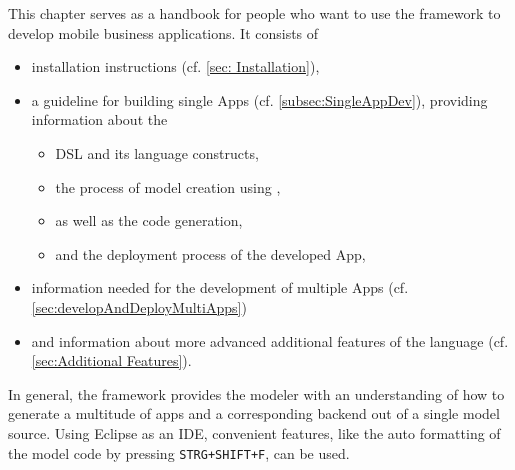 

This chapter serves as a handbook for people who want to use the \MD framework to develop mobile business applications. It consists of

\begin{itemize}
	\item installation instructions (cf. \ref{sec: Installation}),
	\item a guideline for building single Apps (cf. \ref{subsec:SingleAppDev}), providing information about the
	\begin{itemize}
		\item DSL and its language constructs,
		\item the process of model creation using \MD,
		\item as well as the code generation,
		\item and the deployment process of the developed App,
	\end{itemize}
	\item information needed for the development of multiple Apps (cf. \ref{sec:developAndDeployMultiApps})
	\item and information about more advanced additional features of the language (cf. \ref{sec:Additional Features}).
\end{itemize}

In general, the \MD framework provides the modeler with an understanding of how to generate a multitude of apps and a corresponding backend out of a single model source. Using Eclipse as an IDE, convenient features, like the auto formatting of the model code by pressing \lstinline|STRG+SHIFT+F|, can be used.